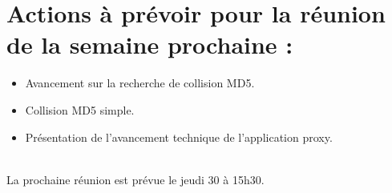 \documentclass[a4paper,11pt,french]{article}
\begin{document}
\section{Actions à prévoir pour la réunion de la semaine prochaine :}
\begin{itemize}
  \item Avancement sur la recherche de collision MD5.
  \item Collision MD5 simple.
  \item Présentation de l'avancement technique de l'application proxy.
\end{itemize}
~\\
La prochaine réunion est prévue le jeudi 30 à 15h30.
\end{document}
